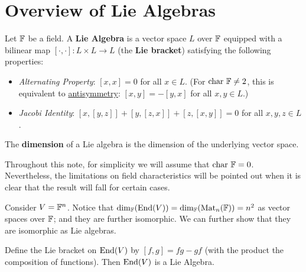 \documentclass{article}
\begin{document}

\tableofcontents  
\clearpage

\section{Overview of Lie Algebras}

\begin{definition}
    Let $\mathbb{F}$ be a field. A \textbf{Lie Algebra} is a vector space $L$ over $\mathbb{F}$ equipped with a bilinear map $[\cdot, \cdot]: L \times L \to L$ (the \textbf{Lie bracket}) satisfying the following properties:
    \begin{itemize}
        \item \emph{Alternating Property}: $[x, x] = 0$ for all $x \in L$. (For $\mathrm{char}\ {\mathbb{F}} \neq 2$, this is equivalent to \underline{antisymmetry}: $[x, y] = -[y, x]$ for all $x, y \in L$.)
        \item \emph{Jacobi Identity}: $[x, [y, z]] + [y, [z, x]] + [z, [x, y]] = 0$ for all $x, y, z \in L$.
    \end{itemize}
    The \textbf{dimension} of a Lie algebra is the dimension of the underlying vector space.
\end{definition}
\nogap
\begin{remark}
    Throughout this note, for simplicity we will assume that $\mathrm{char}\ {\mathbb{F}} = 0$. Nevertheless, the limitations on field characteristics will be pointed out when it is clear that the result will fall for certain cases.
\end{remark}

\begin{example}
    Consider $V = \mathbb{F}^n$. Notice that $\dim_{\mathbb{F}} (\mathrm{End}(V)) = \dim_{\mathbb{F}} (\operatorname{Mat}_n(\mathbb{F})) = n^2$ as vector spaces over $\mathbb{F}$; and they are further isomorphic. We can further show that they are isomorphic as Lie algebras. 
\end{example}

\begin{proposition}
    Define the Lie bracket on $\mathrm{End}(V)$ by $[f, g] = fg - gf$ (with the product the composition of functions). Then $\mathrm{End}(V)$ is a Lie Algebra.
\end{proposition}
\end{document}
